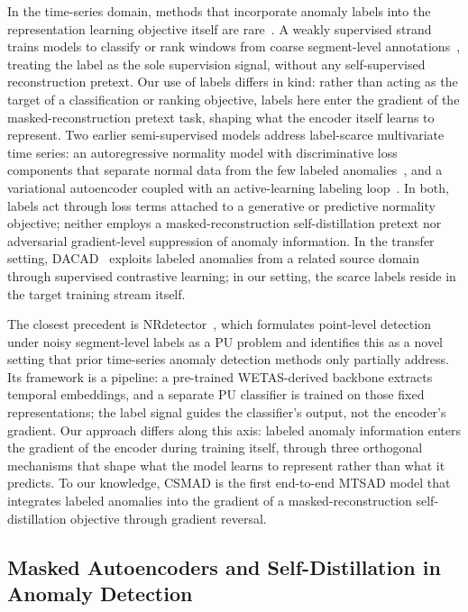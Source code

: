 In the time-series domain, methods that incorporate anomaly labels into the representation learning objective itself are rare~\cite{wang2025nrdetector}.
A weakly supervised strand trains models to classify or rank windows from coarse segment-level annotations~\cite{sultani2018deepmil,lee2021wetas,liu2024treemil}, treating the label as the sole supervision signal, without any self-supervised reconstruction pretext.
Our use of labels differs in kind: rather than acting as the target of a classification or ranking objective, labels here enter the gradient of the masked-reconstruction pretext task, shaping what the encoder itself learns to represent.
Two earlier semi-supervised models address label-scarce multivariate time series: an autoregressive normality model with discriminative loss components that separate normal data from the few labeled anomalies~\cite{xue2022fewpositive}, and a variational autoencoder coupled with an active-learning labeling loop~\cite{huang2022slavae}.
In both, labels act through loss terms attached to a generative or predictive normality objective; neither employs a masked-reconstruction self-distillation pretext nor adversarial gradient-level suppression of anomaly information.
In the transfer setting, DACAD~\cite{darban2024dacad} exploits labeled anomalies from a related source domain through supervised contrastive learning; in our setting, the scarce labels reside in the target training stream itself.

The closest precedent is NRdetector~\cite{wang2025nrdetector}, which formulates point-level detection under noisy segment-level labels as a PU problem and identifies this as a novel setting that prior time-series anomaly detection methods only partially address.
Its framework is a pipeline: a pre-trained WETAS-derived backbone extracts temporal embeddings, and a separate PU classifier is trained on those fixed representations; the label signal guides the classifier's output, not the encoder's gradient.
Our approach differs along this axis: labeled anomaly information enters the gradient of the encoder during training itself, through three orthogonal mechanisms that shape what the model learns to represent rather than what it predicts.
To our knowledge, CSMAD is the first end-to-end MTSAD model that integrates labeled anomalies into the gradient of a masked-reconstruction self-distillation objective through gradient reversal.

\subsection{Masked Autoencoders and Self-Distillation in Anomaly Detection}
\label{sec:related_mae}

